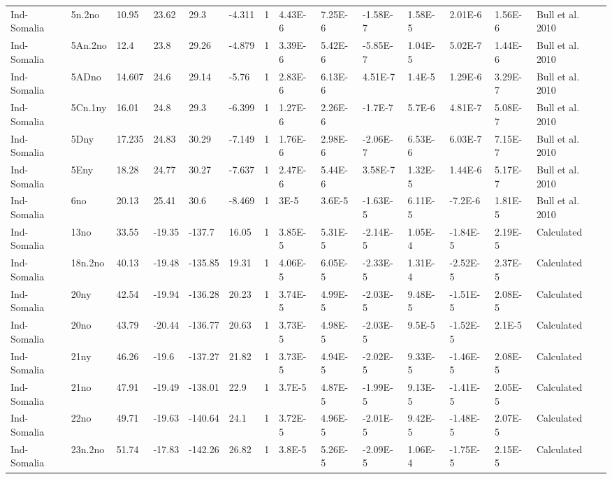 \begin{landscape}
\begin{longtable}{@{}lllllllllllll>{\scriptsize}p{3.1cm}@{}}
Ind-Somalia & 5n.2no & 10.95 & 23.62 & 29.3 & -4.311 & 1 & 4.43E-6 & 7.25E-6 & -1.58E-7 & 1.58E-5 & 2.01E-6 & 1.56E-6 & Bull et al. 2010 \\
Ind-Somalia & 5An.2no & 12.4 & 23.8 & 29.26 & -4.879 & 1 & 3.39E-6 & 5.42E-6 & -5.85E-7 & 1.04E-5 & 5.02E-7 & 1.44E-6 & Bull et al. 2010 \\
Ind-Somalia & 5ADno & 14.607 & 24.6 & 29.14 & -5.76 & 1 & 2.83E-6 & 6.13E-6 & 4.51E-7 & 1.4E-5 & 1.29E-6 & 3.29E-7 & Bull et al. 2010 \\
Ind-Somalia & 5Cn.1ny & 16.01 & 24.8 & 29.3 & -6.399 & 1 & 1.27E-6 & 2.26E-6 & -1.7E-7 & 5.7E-6 & 4.81E-7 & 5.08E-7 & Bull et al. 2010 \\
Ind-Somalia & 5Dny & 17.235 & 24.83 & 30.29 & -7.149 & 1 & 1.76E-6 & 2.98E-6 & -2.06E-7 & 6.53E-6 & 6.03E-7 & 7.15E-7 & Bull et al. 2010 \\
Ind-Somalia & 5Eny & 18.28 & 24.77 & 30.27 & -7.637 & 1 & 2.47E-6 & 5.44E-6 & 3.58E-7 & 1.32E-5 & 1.44E-6 & 5.17E-7 & Bull et al. 2010 \\
Ind-Somalia & 6no & 20.13 & 25.41 & 30.6 & -8.469 & 1 & 3E-5 & 3.6E-5 & -1.63E-5 & 6.11E-5 & -7.2E-6 & 1.81E-5 & Bull et al. 2010 \\
Ind-Somalia & 13no & 33.55 & -19.35 & -137.7 & 16.05 & 1 & 3.85E-5 & 5.31E-5 & -2.14E-5 & 1.05E-4 & -1.84E-5 & 2.19E-5 & Calculated \\
Ind-Somalia & 18n.2no & 40.13 & -19.48 & -135.85 & 19.31 & 1 & 4.06E-5 & 6.05E-5 & -2.33E-5 & 1.31E-4 & -2.52E-5 & 2.37E-5 & Calculated \\
Ind-Somalia & 20ny & 42.54 & -19.94 & -136.28 & 20.23 & 1 & 3.74E-5 & 4.99E-5 & -2.03E-5 & 9.48E-5 & -1.51E-5 & 2.08E-5 & Calculated \\
Ind-Somalia & 20no & 43.79 & -20.44 & -136.77 & 20.63 & 1 & 3.73E-5 & 4.98E-5 & -2.03E-5 & 9.5E-5 & -1.52E-5 & 2.1E-5 & Calculated \\
Ind-Somalia & 21ny & 46.26 & -19.6 & -137.27 & 21.82 & 1 & 3.73E-5 & 4.94E-5 & -2.02E-5 & 9.33E-5 & -1.46E-5 & 2.08E-5 & Calculated \\
Ind-Somalia & 21no & 47.91 & -19.49 & -138.01 & 22.9 & 1 & 3.7E-5 & 4.87E-5 & -1.99E-5 & 9.13E-5 & -1.41E-5 & 2.05E-5 & Calculated \\
Ind-Somalia & 22no & 49.71 & -19.63 & -140.64 & 24.1 & 1 & 3.72E-5 & 4.96E-5 & -2.01E-5 & 9.42E-5 & -1.48E-5 & 2.07E-5 & Calculated \\
Ind-Somalia & 23n.2no & 51.74 & -17.83 & -142.26 & 26.82 & 1 & 3.8E-5 & 5.26E-5 & -2.09E-5 & 1.06E-4 & -1.75E-5 & 2.15E-5 & Calculated \\

\end{longtable}
\end{landscape}
